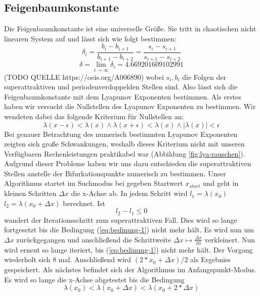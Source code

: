 \documentclass{scrartcl}
\begin{document}
\subsection{Feigenbaumkonstante}
Die Feigenbaumkonstante ist eine universelle Größe. Sie tritt in chaotischen nicht linearen System auf und lässt sich wie folgt bestimmen:
\begin{equation}\delta_i = \frac{b_i-b_{i+1}}{b_{i+1}-b_{i+2}}=\frac{s_i-s_{i+1}}{s_{i+1}-s_{i+2}}\end{equation}
\begin{equation}\delta = \lim\limits_{i \rightarrow \infty}{\delta_i} = 4.669201609102991\end{equation} 
(TODO QUELLE https://oeis.org/A006890)
wobei $s_i, b_i$ die Folgen der superattraktiven und periodenverdoppelden Stellen sind.
Also lässt sich die Feigenbaumkonstante mit dem Lyapunov Exponenten bestimmen. 
Als erstes haben wir versucht die Nullstellen des Lyapunov Exponenten zu bestimmen. Wir wendeten dabei das folgende Kriterium für Nullstellen an:
\begin{equation}
\lambda(x-\epsilon) < \lambda(x) \wedge \lambda(x+\epsilon) < \lambda(x) \wedge |\lambda(x)|<\epsilon
\end{equation}
Bei genauer Betrachtung des numerisch bestimmten Lyapunov Exponenten zeigten sich große Schwankungen, weshalb dieses Kriterium nicht mit unseren Verfügbaren Rechenleistungen praktikabel war (Abbildung \ref{fig:lya-rauschen}).
Aufgrund dieser Probleme
haben wir uns dazu entschieden die superattraktiven Stellen anstelle der Bifurkationspunkte numerisch zu bestimmen. Unser Algorithmus startet im Suchmodus bei gegeben Startwert $x_{start}$ und geht in kleinen Schritten $\Delta x$ die x-Achse ab. In jedem Schritt wird $l_1=\lambda(x_0)$ $l_2=\lambda(x_0 + \Delta x)$ berechnet. 
Ist
\begin{equation}
l_2-l_1 \leq 0 
\label{eq:bedinung-1}
\end{equation}
wandert der Iterationsschritt zum superattraktiven Fall. 
Dies wird so lange fortgesetzt bis die Bedingung (\ref{eq:bedinung-1}) nicht mehr hält. 
Es wird nun um $\Delta x$ zurückgegangen und anschließend die Schrittweite $\Delta x \mapsto \frac{\Delta x}{10} $ verkleinert. Nun wird erneut so lange iteriert, bis (\ref{eq:bedinung-1}) nicht mehr hält. 
Der Vorgang wiederholt sich 8 mal. Anschließend wird $(2*x_0 + \Delta x )/2$ als Ergebniss gespeichert. 
Als nächstes befindet sich der Algorithmus im Anfangspunkt-Modus. Es wird so lange die x-Achse abgetestet bis die Bedingung 
\begin{equation}
\lambda(x_0) < \lambda(x_0 + \Delta x) < \lambda(x_0 + 2*\Delta x)
\end{equation}
\end{document}
